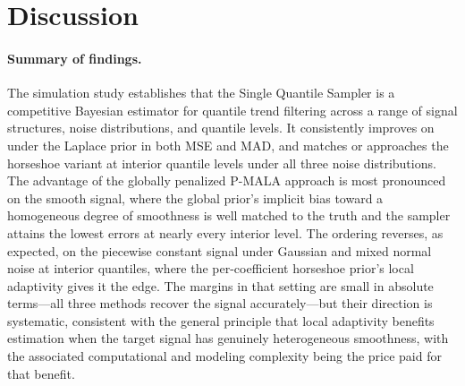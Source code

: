 
\section{Discussion}
\label{sec:discussion}

\paragraph{Summary of findings.}
The simulation study establishes that the Single Quantile Sampler is a competitive Bayesian estimator for quantile trend filtering across a range of signal structures, noise distributions, and quantile levels. It consistently improves on \citet{onizuka2024fast} under the Laplace prior in both MSE and MAD, and matches or approaches the horseshoe variant at interior quantile levels under all three noise distributions. The advantage of the globally penalized P-MALA approach is most pronounced on the smooth signal, where the global prior's implicit bias toward a homogeneous degree of smoothness is well matched to the truth and the sampler attains the lowest errors at nearly every interior level. The ordering reverses, as expected, on the piecewise constant signal under Gaussian and mixed normal noise at interior quantiles, where the per-coefficient horseshoe prior's local adaptivity gives it the edge. The margins in that setting are small in absolute terms---all three methods recover the signal accurately---but their direction is systematic, consistent with the general principle that local adaptivity benefits estimation when the target signal has genuinely heterogeneous smoothness, with the associated computational and modeling complexity being the price paid for that benefit.

